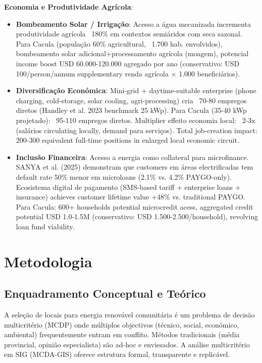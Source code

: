 \documentclass[12pt, a4paper]{article}
\begin{document}
\textbf{Economia e Produtividade Agrícola}:
\begin{itemize}
\item \textbf{Bombeamento Solar / Irrigação}: Acesso a água mecanizada incrementa produtividade agrícola ~180\% em contextos semiáridos com seca sazonal. Para Cacula (população 60\% agricultural, ~1.700 hab. envolvidos), bombeamento solar adicional+processamento agrícola (moagem), potencial income boost USD 60.000-120.000 agregado por ano (conservativo: USD 100/person/annum supplementary renda agrícola × 1.000 beneficiários).
\item \textbf{Diversificação Económica}: Mini-grid + daytime-suitable enterprise (phone charging, cold-storage, solar cooling, agri-processing) cria ~70-80 empregos diretos (Handley et al. 2023 benchmark 25 kWp). Para Cacula (35-40 kWp projetado): ~95-110 empregos diretos. Multiplier effeito economia local: ~2-3x (salários circulating locally, demand para serviços). Total job-creation impact: 200-300 equivalent full-time positions in enlarged local economic circuit.
\item \textbf{Inclusão Financeira}: Acesso a energia como collateral para microfinance. SANYA et al. (2025) demonstram que customers em áreas electrificadas tem default rate 50\% menor em microloans (2.1\% vs. 4.2\% PAYGO-only). Ecosistema digital de pagamento (SMS-based tariff + enterprise loans + insurance) achieves customer lifetime value +48\% vs. traditional PAYGO. Para Cacula: 600+ households potential microcredit acess, aggregated credit potential USD 1.0-1.5M (conservativo: USD 1.500-2.500/household), revolving loan fund viability.
\end{itemize}



\section{Metodologia}

\subsection{Enquadramento Conceptual e Teórico}
A seleção de locais para energia renovável comunitária é um problema de decisão multicritério (MCDP) onde múltiplos objectivos (técnico, social, económico, ambiental) frequentemente entram em conflito. Métodos tradicionais (média provincial, opinião especialista) são ad-hoc e enviesados. A análise multicritério em SIG (MCDA-GIS) oferece estrutura formal, transparente e replicável.
\end{document}
